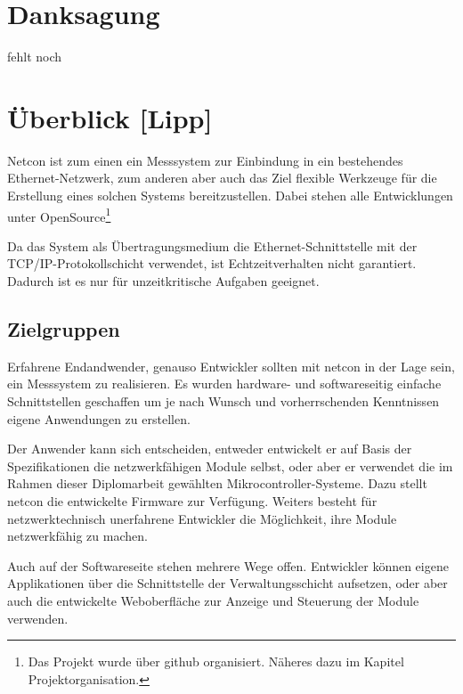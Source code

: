 \documentclass[a4paper,14pt,headsepline]{scrartcl}
\begin{document}
\newpage

\section*{Danksagung}
fehlt noch

\newpage


\newpage

\tableofcontents
\newpage


\section{Überblick [Lipp]}

Netcon ist zum einen ein Messsystem zur Einbindung in ein bestehendes Ethernet-Netzwerk, zum anderen aber auch das Ziel flexible Werkzeuge für die Erstellung eines solchen Systems bereitzustellen. Dabei stehen alle Entwicklungen unter OpenSource\footnote{Das Projekt wurde über github organisiert. Näheres dazu im Kapitel Projektorganisation.} 

Da das System als Übertragungsmedium die Ethernet-Schnittstelle mit der TCP/IP-Protokollschicht verwendet, ist Echtzeitverhalten nicht garantiert. Dadurch ist es nur für unzeitkritische Aufgaben geeignet. 

\subsection{Zielgruppen}
Erfahrene Endandwender, genauso Entwickler sollten mit netcon in der Lage sein, ein Messsystem zu realisieren. Es wurden hardware- und softwareseitig einfache Schnittstellen geschaffen um je nach Wunsch und vorherrschenden Kenntnissen eigene Anwendungen zu erstellen. 

Der Anwender kann sich entscheiden, entweder entwickelt er auf Basis der Spezifikationen die netzwerkfähigen Module selbst, oder aber er verwendet die im Rahmen dieser Diplomarbeit gewählten Mikrocontroller-Systeme. Dazu stellt netcon die entwickelte Firmware zur Verfügung. Weiters besteht für netzwerktechnisch unerfahrene Entwickler die Möglichkeit, ihre Module netzwerkfähig zu machen.
\newpage

Auch auf der Softwareseite stehen mehrere Wege offen. Entwickler können eigene Applikationen über die Schnittstelle der Verwaltungsschicht aufsetzen, oder aber auch die entwickelte Weboberfläche zur Anzeige und Steuerung der Module verwenden.
\end{document}
